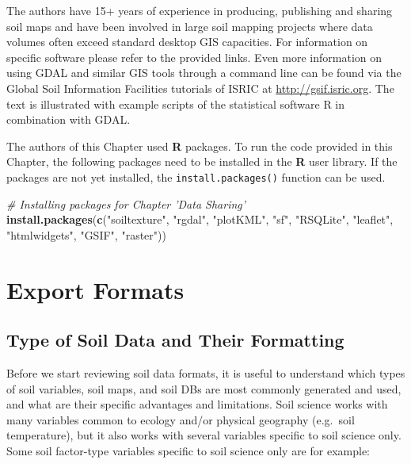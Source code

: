 \documentclass[10pt,b5paper,]{book}
\newenvironment{Shaded}{\begin{snugshade}}{\end{snugshade}}
\newcommand{\CommentTok}[1]{\textcolor[rgb]{0.56,0.35,0.01}{\textit{#1}}}
\newcommand{\KeywordTok}[1]{\textcolor[rgb]{0.13,0.29,0.53}{\textbf{#1}}}
\newcommand{\NormalTok}[1]{#1}
\newcommand{\StringTok}[1]{\textcolor[rgb]{0.31,0.60,0.02}{#1}}
\theoremstyle{definition}
\theoremstyle{definition}
\theoremstyle{definition}
\theoremstyle{remark}
\begin{document}
The authors have 15+ years of experience in producing, publishing and
sharing soil maps and have been involved in large soil mapping projects
where data volumes often exceed standard desktop GIS capacities. For
information on specific software please refer to the provided links.
Even more information on using GDAL and similar GIS tools through a
command line can be found via the Global Soil Information Facilities
tutorials of ISRIC at \url{http://gsif.isric.org}. The text is
illustrated with example scripts of the statistical software R in
combination with GDAL.

The authors of this Chapter used \textbf{R} packages. To run the code
provided in this Chapter, the following packages need to be installed in
the \textbf{R} user library. If the packages are not yet installed, the
\texttt{install.packages()} function can be used.

\begin{Shaded}
\begin{Highlighting}[]
\CommentTok{# Installing packages for Chapter 'Data Sharing'}
\KeywordTok{install.packages}\NormalTok{(}\KeywordTok{c}\NormalTok{(}\StringTok{"soiltexture"}\NormalTok{, }\StringTok{"rgdal"}\NormalTok{, }\StringTok{"plotKML"}\NormalTok{,}
                   \StringTok{"sf"}\NormalTok{, }\StringTok{"RSQLite"}\NormalTok{, }\StringTok{"leaflet"}\NormalTok{,}
                   \StringTok{"htmlwidgets"}\NormalTok{, }\StringTok{"GSIF"}\NormalTok{, }\StringTok{"raster"}\NormalTok{))}
\end{Highlighting}
\end{Shaded}

\hypertarget{export-formats}{%
\section{Export Formats}\label{export-formats}}

\hypertarget{type-of-soil-data-and-their-formatting}{%
\subsection{Type of Soil Data and Their
Formatting}\label{type-of-soil-data-and-their-formatting}}

Before we start reviewing soil data formats, it is useful to understand
which types of soil variables, soil maps, and soil DBs are most commonly
generated and used, and what are their specific advantages and
limitations. Soil science works with many variables common to ecology
and/or physical geography (e.g.~soil temperature), but it also works
with several variables specific to soil science only. Some soil
factor-type variables specific to soil science only are for example:
\end{document}
